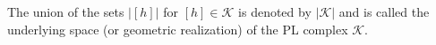 The union of the sets $|[h]|$ for $[h] \in \mathcal{K}$ is denoted by $|\mathcal{K}|$ and is called the underlying space (or geometric realization) of the PL complex $\mathcal{K}$.
